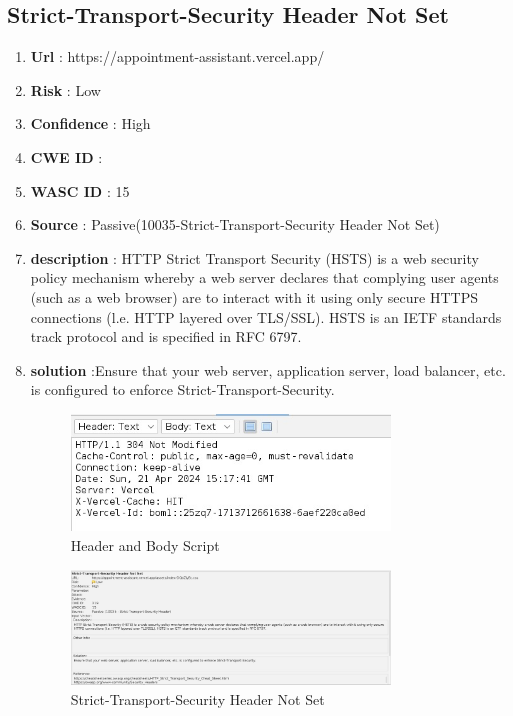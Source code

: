 \documentclass[openany]{report}
\begin{document}
\subsection{Strict-Transport-Security Header Not Set
}
\begin{enumerate}
    \item \textbf{Url} : https://appointment-assistant.vercel.app/
    \item \textbf{Risk} : Low
    \item \textbf{Confidence} : High
    \item \textbf{CWE ID} :
    \item \textbf{WASC ID} : 15
    \item \textbf{Source} : Passive(10035-Strict-Transport-Security Header Not Set)
    \item \textbf{description} : HTTP Strict Transport Security (HSTS) is a web security policy mechanism whereby a web server declares that complying user agents (such as a web browser) are to interact with it using only secure HTTPS connections (l.e. HTTP layered over TLS/SSL). HSTS is an IETF standards track protocol and is specified in RFC 6797.


    \item \textbf{solution} :Ensure that your web server, application server, load balancer, etc. is configured to enforce Strict-Transport-Security.

          \begin{figure}[H]
              \centering
              \includegraphics[width=0.8\textwidth]{imgs/5.jpg}
              \caption{ Header and Body Script}
              \label{fig:my_label8}
          \end{figure}
          \begin{figure}[H]
              \centering
              \includegraphics[width=0.8\textwidth]{imgs/Low.jpg}
              \caption{Strict-Transport-Security Header Not Set}
              \label{fig:my_label9}
          \end{figure}
\end{enumerate}
\end{document}
